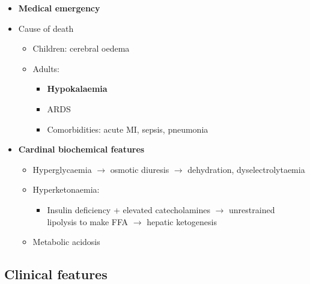 \documentclass[
  12pt,
]{memoir}
\providecommand{\tightlist}{%
  \setlength{\itemsep}{0pt}\setlength{\parskip}{0pt}}
\begin{document}
\begin{itemize}
\tightlist
\item
  \textbf{Medical emergency}
\item
  Cause of death

  \begin{itemize}
  \tightlist
  \item
    Children: cerebral oedema
  \item
    Adults:

    \begin{itemize}
    \tightlist
    \item
      \textbf{Hypokalaemia}
    \item
      ARDS
    \item
      Comorbidities: acute MI, sepsis, pneumonia
    \end{itemize}
  \end{itemize}
\item
  \textbf{Cardinal biochemical features}

  \begin{itemize}
  \tightlist
  \item
    Hyperglycaemia \(\rightarrow\) osmotic diuresis \(\rightarrow\)
    dehydration, dyselectrolytaemia
  \item
    Hyperketonaemia:

    \begin{itemize}
    \tightlist
    \item
      Insulin deficiency + elevated catecholamines \(\rightarrow\)
      unrestrained lipolysis to make FFA \(\rightarrow\) hepatic
      ketogenesis
    \end{itemize}
  \item
    Metabolic acidosis
  \end{itemize}
\end{itemize}

\hypertarget{clinical-features}{%
\subsection{Clinical features}\label{clinical-features}}
\end{document}
